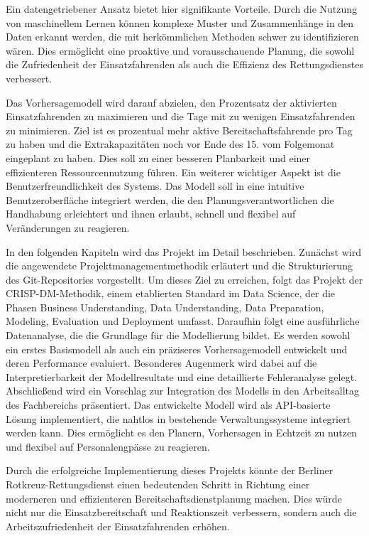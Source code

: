 \documentclass[%
pdftex,
oneside,			%
11pt,				%
parskip=half,		%
headheight = 12pt,	%
headsepline,		%
footsepline,		%
footheight = 16pt,	%
abstracton,		%
DIV=calc,		%
BCOR=8mm,		%
headinclude=false,	%
footinclude=false,	%
listof=totoc,		%
toc=bibliography,	%
]{scrreprt}	%
\begin{document}
    Ein datengetriebener Ansatz bietet hier signifikante Vorteile. 
    Durch die Nutzung von maschinellem Lernen können komplexe Muster und Zusammenhänge in den Daten erkannt werden, die mit herkömmlichen Methoden schwer zu identifizieren wären. 
    Dies ermöglicht eine proaktive und vorausschauende Planung, die sowohl die Zufriedenheit der Einsatzfahrenden als auch die Effizienz des Rettungsdienstes verbessert.
    
    Das Vorhersagemodell wird darauf abzielen, den Prozentsatz der aktivierten Einsatzfahrenden zu maximieren und die Tage mit zu wenigen Einsatzfahrenden zu minimieren. 
    Ziel ist es prozentual mehr aktive Bereitschaftsfahrende pro Tag zu haben und die Extrakapazitäten noch vor Ende des 15. vom Folgemonat eingeplant zu haben.
    Dies soll zu einer besseren Planbarkeit und einer effizienteren Ressourcennutzung führen. 
    Ein weiterer wichtiger Aspekt ist die Benutzerfreundlichkeit des Systems. 
    Das Modell soll in eine intuitive Benutzeroberfläche integriert werden, die den Planungsverantwortlichen die Handhabung erleichtert und ihnen erlaubt, schnell und flexibel auf Veränderungen zu reagieren.
    
    In den folgenden Kapiteln wird das Projekt im Detail beschrieben. 
    Zunächst wird die angewendete Projektmanagementmethodik erläutert und die Strukturierung des Git-Repositories vorgestellt. 
    Um dieses Ziel zu erreichen, folgt das Projekt der CRISP-DM-Methodik, einem etablierten Standard im Data Science, der die Phasen Business Understanding, Data Understanding, Data Preparation, Modeling, Evaluation und Deployment umfasst.
    Daraufhin folgt eine ausführliche Datenanalyse, die die Grundlage für die Modellierung bildet. 
    Es werden sowohl ein erstes Basismodell als auch ein präziseres Vorhersagemodell entwickelt und deren Performance evaluiert. 
    Besonderes Augenmerk wird dabei auf die Interpretierbarkeit der Modellresultate und eine detaillierte Fehleranalyse gelegt. 
    Abschließend wird ein Vorschlag zur Integration des Modells in den Arbeitsalltag des Fachbereichs präsentiert. 
    Das entwickelte Modell wird als API-basierte Lösung implementiert, die nahtlos in bestehende Verwaltungssysteme integriert werden kann. 
    Dies ermöglicht es den Planern, Vorhersagen in Echtzeit zu nutzen und flexibel auf Personalengpässe zu reagieren.
    
    Durch die erfolgreiche Implementierung dieses Projekts könnte der Berliner Rotkreuz-Rettungsdienst einen bedeutenden Schritt in Richtung einer moderneren und effizienteren Bereitschaftsdienstplanung machen. 
    Dies würde nicht nur die Einsatzbereitschaft und Reaktionszeit verbessern, sondern auch die Arbeitszufriedenheit der Einsatzfahrenden erhöhen.
    
\end{document}
